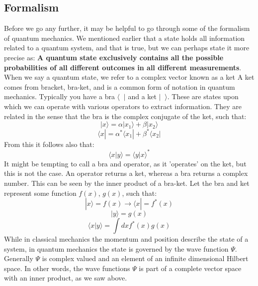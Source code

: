 \documentclass[12pt]{article}
\begin{document}
{\subsection{Formalism}
Before we go any further, it may be helpful to go through some of the formalism of quantum mechanics. \newline
We mentioned earlier that a state holds all information related to a quantum system, and that is true, but we can perhaps state it more precise as: \textbf{A quantum state exclusively contains all the possible probabilities of all different outcomes in all different measurements}. When we say a quantum state, we refer to a complex vector known as a ket
\newline
A ket comes from bracket, bra-ket, and is a common form of notation in quantum mechanics. Typically you have a bra $\langle\;\; |$ and a ket $| \;\; \rangle$. These are states upon which we can operate with various operators to extract information. They are related in the sense that the bra is the complex conjugate of the ket, such that:
\begin{equation*}
    |x\rangle = \alpha |x_1 \rangle + \beta | x_2 \rangle
\end{equation*}
\begin{equation*}
    \langle x | = \alpha^* \langle x_1 | + \beta^* \langle x_2 |
\end{equation*}
From this it follows also that:
\begin{equation*}
    \langle x | y \rangle = \langle y | x \rangle^*
\end{equation*}
It might be tempting to call a bra and operator, as it 'operates' on the ket, but this is not the case. An operator returns a ket, whereas a bra returns a complex number. This can be seen by the inner product of a bra-ket. Let the bra and ket represent some function $f(x)$, $g(x)$, such that:
\begin{equation*}
    | x \rangle = f(x) \xrightarrow[]{} \langle x | = f^*(x)
\end{equation*}
\begin{equation*}
    | y \rangle = g(x)
\end{equation*}
\begin{equation*}
    \langle x | y \rangle = \int dx f^*(x) g(x)
\end{equation*}
While in classical mechanics the momentum and position describe the state of a system, in quantum mechanics the state is governed by the wave function $\Psi$. Generally $\Psi$ is complex valued and an element of an infinite dimensional Hilbert space. In other words, the wave functions $\Psi$ is part of a complete vector space with an inner product, as we saw above.
\newpage
}
\end{document}
